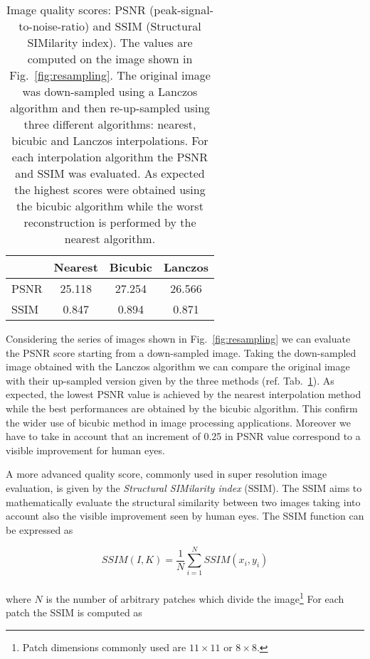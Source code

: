 \documentclass{standalone}
\begin{document}
\begin{table}[htbp]
\centering
\begin{tabular}{lccc}
\hline \rowcolor{darkgrayrow}
         & Nearest       & Bicubic        & Lanczos  \\
\hline
PSNR     & 25.118        & 27.254         & 26.566   \\
SSIM     &  0.847        &  0.894         &  0.871   \\
\hline
\end{tabular}
\caption{Image quality scores: PSNR (peak-signal-to-noise-ratio) and SSIM (Structural SIMilarity index).
The values are computed on the image shown in Fig.~\ref{fig:resampling}.
The original image was down-sampled using a Lanczos algorithm and then re-up-sampled using three different algorithms: nearest, bicubic and Lanczos interpolations.
For each interpolation algorithm the PSNR and SSIM was evaluated.
As expected the highest scores were obtained using the bicubic algorithm while the worst reconstruction is performed by the nearest algorithm.
}
\label{tab:psnr}
\end{table}

Considering the series of images shown in Fig.~\ref{fig:resampling} we can evaluate the PSNR score starting from a down-sampled image.
Taking the down-sampled image obtained with the Lanczos algorithm we can compare the original image with their up-sampled version given by the three methods (ref. Tab.~\ref{tab:psnr}).
As expected, the lowest PSNR value is achieved by the nearest interpolation method while the best performances are obtained by the bicubic algorithm.
This confirm the wider use of bicubic method in image processing applications.
Moreover we have to take in account that an increment of 0.25 in PSNR value correspond to a visible improvement for human eyes.

A more advanced quality score, commonly used in super resolution image evaluation, is given by the \emph{Structural SIMilarity index} (SSIM).
The SSIM aims to mathematically evaluate the structural similarity between two images taking into account also the visible improvement seen by human eyes.
The SSIM function can be expressed as

$$
SSIM(I, K) = \frac{1}{N}\sum_{i=1}^{N} SSIM(x_{i}, y_{i})
$$
\\
where $N$ is the number of arbitrary patches which divide the image\footnote{
  Patch dimensions commonly used are $11\times11$ or $8\times8$.
}
For each patch the SSIM is computed as
\end{document}
